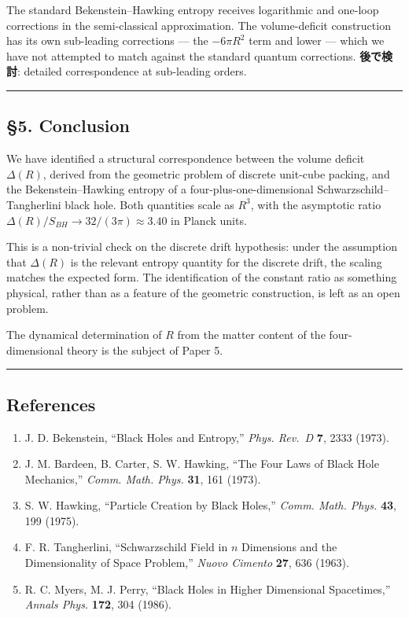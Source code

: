 \documentclass[a4paper,11pt]{article}
\theoremstyle{definition}
\providecommand{\tightlist}{\setlength{\itemsep}{0pt}\setlength{\parskip}{0pt}}
\begin{document}
The standard Bekenstein--Hawking entropy receives logarithmic and
one-loop corrections in the semi-classical approximation. The
volume-deficit construction has its own sub-leading corrections --- the
\(-6\pi R^2\) term and lower --- which we have not attempted to match
against the standard quantum corrections. \textbf{後で検討}: detailed
correspondence at sub-leading orders.

\begin{center}\rule{0.5\linewidth}{0.5pt}\end{center}

\subsection{§5. Conclusion}\label{conclusion}

We have identified a structural correspondence between the volume
deficit \(\Delta(R)\), derived from the geometric problem of discrete
unit-cube packing, and the Bekenstein--Hawking entropy of a
four-plus-one-dimensional Schwarzschild--Tangherlini black hole. Both
quantities scale as \(R^3\), with the asymptotic ratio
\(\Delta(R)/S_{BH} \to 32/(3\pi) \approx 3.40\) in Planck units.

This is a non-trivial check on the discrete drift hypothesis: under the
assumption that \(\Delta(R)\) is the relevant entropy quantity for the
discrete drift, the scaling matches the expected form. The
identification of the constant ratio as something physical, rather than
as a feature of the geometric construction, is left as an open problem.

The dynamical determination of \(R\) from the matter content of the
four-dimensional theory is the subject of Paper 5.

\begin{center}\rule{0.5\linewidth}{0.5pt}\end{center}

\subsection{References}\label{references}

\begin{enumerate}
\def\labelenumi{\arabic{enumi}.}
\tightlist
\item
  J. D. Bekenstein, ``Black Holes and Entropy,'' \emph{Phys. Rev.~D}
  \textbf{7}, 2333 (1973).
\item
  J. M. Bardeen, B. Carter, S. W. Hawking, ``The Four Laws of Black Hole
  Mechanics,'' \emph{Comm. Math. Phys.} \textbf{31}, 161 (1973).
\item
  S. W. Hawking, ``Particle Creation by Black Holes,'' \emph{Comm. Math.
  Phys.} \textbf{43}, 199 (1975).
\item
  F. R. Tangherlini, ``Schwarzschild Field in \(n\) Dimensions and the
  Dimensionality of Space Problem,'' \emph{Nuovo Cimento} \textbf{27},
  636 (1963).
\item
  R. C. Myers, M. J. Perry, ``Black Holes in Higher Dimensional
  Spacetimes,'' \emph{Annals Phys.} \textbf{172}, 304 (1986).
\end{enumerate}
\end{document}
